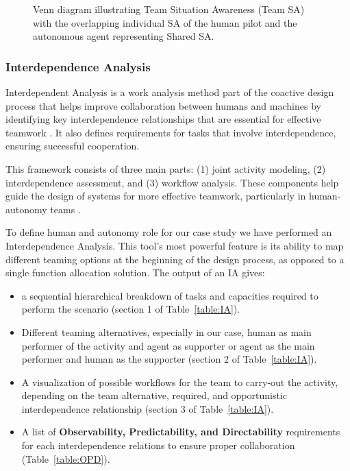 \documentclass[12pt,a4paper]{article} %
\begin{document}
	\begin{figure}[h!]
		\centering
		\caption{Venn diagram illustrating Team Situation Awareness (Team SA) with the overlapping individual SA of the human pilot and the autonomous agent representing Shared SA.}
		\label{fig:team-sa-venn}
	\end{figure}

	\subsubsection{Interdependence Analysis}
	Interdependent Analysis is a work analysis method part of the coactive design process that helps improve collaboration between humans and machines by identifying key interdependence relationships that are essential for effective teamwork \parencite{johnson_coactive_2014}. It also defines requirements for tasks that involve interdependence, ensuring successful cooperation. 
	
	This framework consists of three main parts: (1) joint activity modeling, (2) interdependence assessment, and (3) workflow analysis. These components help guide the design of systems for more effective teamwork, particularly in human-autonomy teams \parencite{johnson_understanding_2018}.
	
	To define human and autonomy role for our case study we have performed an Interdependence Analysis. This tool's most powerful feature is its ability to map different teaming options at the beginning of the design process, as opposed to a single function allocation solution. The output of an IA gives:
	\begin{itemize}
		\item a sequential hierarchical breakdown of tasks and capacities required to perform the scenario (section 1 of Table~\ref{table:IA}).
		\item Different teaming alternatives, especially in our case, human as main performer of the activity and agent as supporter or agent as the main performer and human as the supporter (section 2 of Table~\ref{table:IA}).
		\item A visualization of possible workflows for the team to carry-out the activity, depending on the team alternative, required, and opportunistic interdependence relationship (section 3 of Table~\ref{table:IA}).
		\item A list of \textbf{Observability, Predictability, and Directability} requirements for each interdependence relations to ensure proper collaboration (Table~\ref{table:OPD}).
	\end{itemize}
\end{document}
